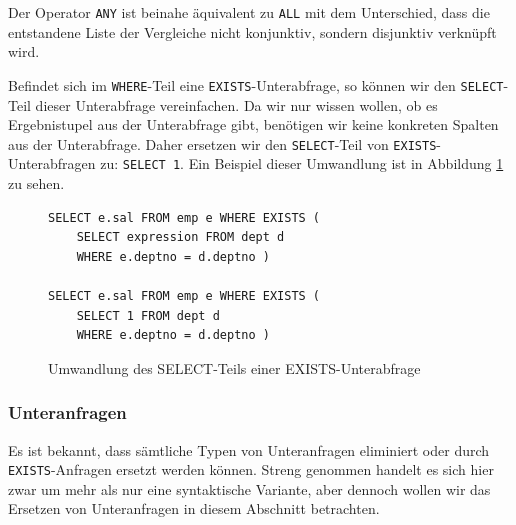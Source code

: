 Der Operator \verb|ANY| ist beinahe äquivalent zu \verb|ALL| mit dem Unterschied, dass die entstandene Liste der Vergleiche nicht konjunktiv, sondern disjunktiv verknüpft wird.

Befindet sich im \verb|WHERE|-Teil eine \verb|EXISTS|-Unterabfrage, so können wir den \verb|SELECT|-Teil dieser Unterabfrage vereinfachen. Da wir nur wissen wollen, ob es Ergebnistupel aus der Unterabfrage gibt, benötigen wir keine konkreten Spalten aus der Unterabfrage. Daher ersetzen wir den \verb|SELECT|-Teil von \verb|EXISTS|-Unterabfragen zu: \verb|SELECT 1|. Ein Beispiel dieser Umwandlung ist in Abbildung \ref{fig:exists_ex1} zu sehen.

\begin{figure}[H]
\begin{verbatim}
SELECT e.sal FROM emp e WHERE EXISTS (
    SELECT expression FROM dept d 
    WHERE e.deptno = d.deptno )
    
SELECT e.sal FROM emp e WHERE EXISTS (
    SELECT 1 FROM dept d 
    WHERE e.deptno = d.deptno )
\end{verbatim}
\caption{Umwandlung des SELECT-Teils einer EXISTS-Unterabfrage}
\label{fig:exists_ex1}
\end{figure}



\subsubsection*{Unteranfragen}

Es ist bekannt, dass sämtliche Typen von Unteranfragen eliminiert oder durch \verb|EXISTS|-Anfragen ersetzt werden können. Streng genommen handelt es sich hier zwar um mehr als nur eine syntaktische Variante, aber dennoch wollen wir das Ersetzen von Unteranfragen in diesem Abschnitt betrachten.

